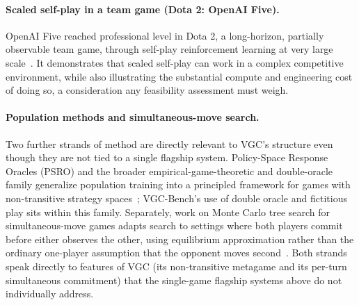 \paragraph{Scaled self-play in a team game (Dota 2: OpenAI Five).}
OpenAI Five reached professional level in Dota 2, a long-horizon, partially
observable team game, through self-play reinforcement learning at very large
scale~\cite{berner2019openaifive}. It demonstrates that scaled self-play can work
in a complex competitive environment, while also illustrating the substantial
compute and engineering cost of doing so, a consideration any feasibility
assessment must weigh.

\paragraph{Population methods and simultaneous-move search.}
Two further strands of method are directly relevant to VGC's structure even though
they are not tied to a single flagship system. Policy-Space Response Oracles
(PSRO) and the broader empirical-game-theoretic and double-oracle family
generalize population training into a principled framework for games with
non-transitive strategy spaces~\cite{lanctot2017psro}; VGC-Bench's use of double
oracle and fictitious play sits within this family. Separately, work on Monte
Carlo tree search for simultaneous-move games adapts search to settings where both
players commit before either observes the other, using equilibrium approximation
rather than the ordinary one-player assumption that the opponent moves
second~\cite{lanctot2014smmcts}. Both strands speak directly to features of VGC
(its non-transitive metagame and its per-turn simultaneous commitment) that the
single-game flagship systems above do not individually address.

\newpage
